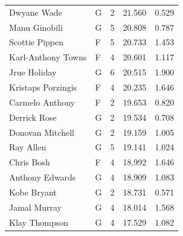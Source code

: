 \begin{table}[t]
\begin{tabular*}{\linewidth}{@{\extracolsep{\fill}}llcrr}
Dwyane Wade & G & 2 & 21.560 & 0.529 \\ 
Manu Ginobili & G & 5 & 20.808 & 0.787 \\ 
Scottie Pippen & F & 5 & 20.733 & 1.453 \\ 
Karl-Anthony Towns & F & 4 & 20.601 & 1.117 \\ 
Jrue Holiday & G & 6 & 20.515 & 1.900 \\ 
Kristaps Porzingis & F & 4 & 20.235 & 1.646 \\ 
Carmelo Anthony & F & 2 & 19.653 & 0.820 \\ 
Derrick Rose & G & 2 & 19.534 & 0.708 \\ 
Donovan Mitchell & G & 2 & 19.159 & 1.005 \\ 
Ray Allen & G & 5 & 19.141 & 1.024 \\ 
Chris Bosh & F & 4 & 18.992 & 1.646 \\ 
Anthony Edwards & G & 4 & 18.909 & 1.083 \\ 
Kobe Bryant & G & 2 & 18.731 & 0.571 \\ 
Jamal Murray & G & 4 & 18.014 & 1.568 \\ 
Klay Thompson & G & 4 & 17.529 & 1.082 \\ 
\bottomrule
\end{tabular*}
\end{table}

